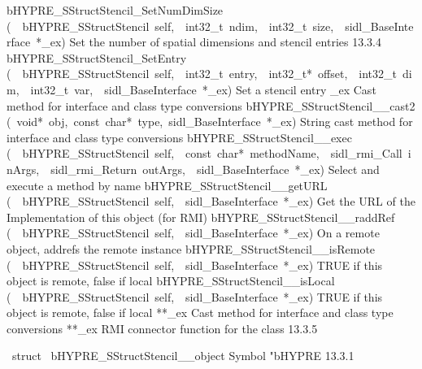 \documentclass{article}
\begin{document}
\begin{cxxentry}
\begin{cxxentry}
\begin{cxxnames}
        {bHYPRE\_SStructStencil\_SetNumDimSize}
        {(\ \ bHYPRE\_SStructStencil\ self,\ \ int32\_t\ ndim,\ \ int32\_t\ size,\ \ sidl\_BaseInterface\ *\_ex)}
        {
Set the number of spatial dimensions and stencil entries}
        {13.3.4}
        {bHYPRE\_SStructStencil\_SetEntry}
        {(\ \ bHYPRE\_SStructStencil\ self,\ \ int32\_t\ entry,\ \ int32\_t*\ offset,\ \ int32\_t\ dim,\ \ int32\_t\ var,\ \ sidl\_BaseInterface\ *\_ex)}
        {
Set a stencil entry}
        {}
\label{cxx.13.3.10}
        {\_ex}
        {}
        {
Cast method for interface and class type conversions}
        {}
\label{cxx.13.3.11}
        {bHYPRE\_SStructStencil\_\_cast2}
        {(\ void*\ obj,\ const\ char*\ type,\ sidl\_BaseInterface\ *\_ex)}
        {
String cast method for interface and class type conversions}
        {}
\label{cxx.13.3.12}
        {bHYPRE\_SStructStencil\_\_exec}
        {(\ \ bHYPRE\_SStructStencil\ self,\ \ const\ char*\ methodName,\ \ sidl\_rmi\_Call\ inArgs,\ \ sidl\_rmi\_Return\ outArgs,\ \ sidl\_BaseInterface\ *\_ex)}
        {
Select and execute a method by name}
        {}
\label{cxx.13.3.13}
        {bHYPRE\_SStructStencil\_\_getURL}
        {(\ \ bHYPRE\_SStructStencil\ self,\ \ sidl\_BaseInterface\ *\_ex)}
        {
Get the URL of the Implementation of this object (for RMI)}
        {}
\label{cxx.13.3.14}
        {bHYPRE\_SStructStencil\_\_raddRef}
        {(\ \ bHYPRE\_SStructStencil\ self,\ \ sidl\_BaseInterface\ *\_ex)}
        {
On a remote object, addrefs the remote instance}
        {}
\label{cxx.13.3.15}
        {bHYPRE\_SStructStencil\_\_isRemote}
        {(\ \ bHYPRE\_SStructStencil\ self,\ \ sidl\_BaseInterface\ *\_ex)}
        {
TRUE if this object is remote, false if local}
        {}
\label{cxx.13.3.16}
        {bHYPRE\_SStructStencil\_\_isLocal}
        {(\ \ bHYPRE\_SStructStencil\ self,\ \ sidl\_BaseInterface\ *\_ex)}
        {
TRUE if this object is remote, false if local}
        {}
\label{cxx.13.3.17}
        {**\_ex}
        {}
        {
Cast method for interface and class type conversions}
        {}
\label{cxx.13.3.18}
        {**\_ex}
        {}
        {
RMI connector function for the class}
        {13.3.5}
\end{cxxnames}
\begin{cxxvariable}
{\ struct\ }
        {bHYPRE\_SStructStencil\_\_object}
        {}
        {
Symbol "bHYPRE}
        {13.3.1}
\begin{cxxdoc}


\end{cxxdoc}
\end{cxxvariable}
\end{cxxentry}
\end{cxxentry}
\end{document}
